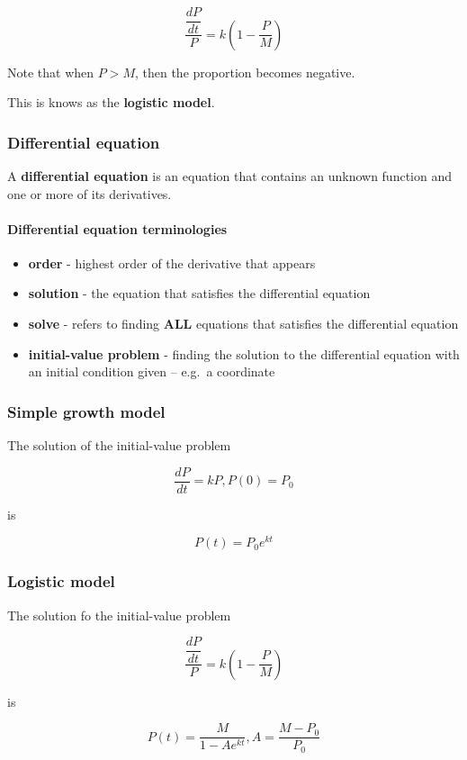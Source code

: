 \documentclass[
]{article}
\providecommand{\tightlist}{%
  \setlength{\itemsep}{0pt}\setlength{\parskip}{0pt}}
\begin{document}
\[\frac{\dfrac{dP}{dt}}{P} = k\left(1-\frac{P}{M}\right)\]

Note that when \(P > M\), then the proportion becomes negative.

This is knows as the \textbf{logistic model}.

\hypertarget{differential-equation}{%
\subsubsection{Differential equation}\label{differential-equation}}

A \textbf{differential equation} is an equation that contains an unknown
function and one or more of its derivatives.

\hypertarget{differential-equation-terminologies}{%
\paragraph*{Differential equation
terminologies}\label{differential-equation-terminologies}}

\begin{itemize}
\tightlist
\item
  \textbf{order} - highest order of the derivative that appears
\item
  \textbf{solution} - the equation that satisfies the differential
  equation
\item
  \textbf{solve} - refers to finding \textbf{ALL} equations that
  satisfies the differential equation
\item
  \textbf{initial-value problem} - finding the solution to the
  differential equation with an initial condition given -- e.g.~a
  coordinate
\end{itemize}

\hypertarget{simple-growth-model}{%
\subsubsection{Simple growth model}\label{simple-growth-model}}

The solution of the initial-value problem

\[ \frac{dP}{dt} = kP, P(0) = P_0 \]

is

\[P(t) = P_0e^{kt} \]

\hypertarget{logistic-model}{%
\subsubsection{Logistic model}\label{logistic-model}}

The solution fo the initial-value problem

\[\dfrac{\dfrac{dP}{dt}}{P} = k \left(1-\frac{P}{M}\right)\]

is

\[ P(t) = \frac{M}{1-Ae^{kt}}, A = \frac{M-P_0}{P_0} \]
\end{document}

